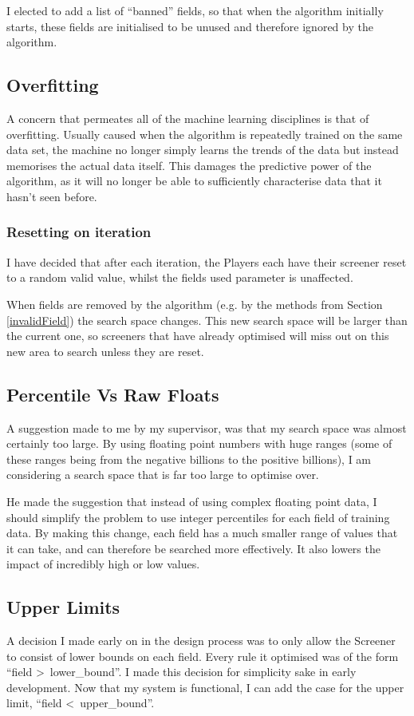 I elected to add a list of ``banned'' fields, so that when the algorithm initially starts, these fields are initialised to be unused and therefore ignored by the algorithm.

\subsection{Overfitting}
A concern that permeates all of the machine learning disciplines is that of overfitting. Usually caused when the algorithm is repeatedly trained on the same data set, the machine no longer simply learns the trends of the data but instead memorises the actual data itself. This damages the predictive power of the algorithm, as it will no longer be able to sufficiently characterise data that it hasn't seen before.

\subsubsection{Resetting on iteration} \label{iterReset}
I have decided that after each iteration, the Players each have their screener reset to a random valid value, whilst the fields used parameter is unaffected. \newline

When fields are removed by the algorithm (e.g. by the methods from Section \ref{invalidField}) the search space changes. This new search space will be larger than the current one, so screeners that have already optimised will miss out on this new area to search unless they are reset.

\subsection{Percentile Vs Raw Floats}
A suggestion made to me by my supervisor, was that my search space was almost certainly too large. By using floating point numbers with huge ranges (some of these ranges being from the negative billions to the positive billions), I am considering a search space that is far too large to optimise over. \newline

He made the suggestion that instead of using complex floating point data, I should simplify the problem to use integer percentiles for each field of training data. By making this change, each field has a much smaller range of values that it can take, and can therefore be searched more effectively. It also lowers the impact of incredibly high or low values.

\subsection{Upper Limits}
A decision I made early on in the design process was to only allow the Screener to consist of lower bounds on each field. Every rule it optimised was of the form ``field \textgreater \, lower\_bound''. I made this decision for simplicity sake in early development. Now that my system is functional, I can add the case for the upper limit, ``field \textless \, upper\_bound''. \newline